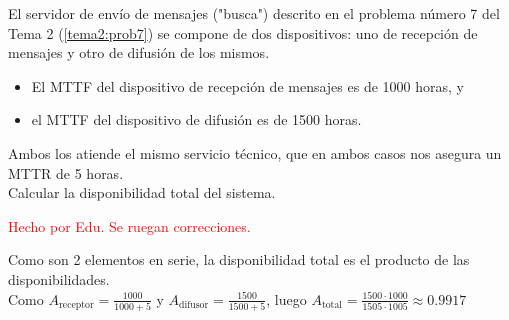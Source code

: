 \begin{problem}[3]
El servidor de envío de mensajes ("busca") descrito en el problema número 7 del Tema 2 (\ref{tema2:prob7}) se compone de dos dispositivos: uno de recepción de mensajes y otro de difusión de los mismos.
\begin{itemize}
\item El MTTF del dispositivo de recepción de mensajes es de 1000 horas, y
\item el MTTF del dispositivo de difusión es de 1500 horas.
\end{itemize}
Ambos los atiende el mismo servicio técnico, que en ambos casos nos asegura un MTTR de 5 horas.\\

Calcular la disponibilidad total del sistema.

\solution
\textcolor{red}{Hecho por Edu. Se ruegan correcciones.}

Como son 2 elementos en serie, la disponibilidad total es el producto de las disponibilidades.\\

Como $ A_{\text{receptor}} = \frac{1000}{1000+5}$ y $A_{\text{difusor}} = \frac{1500}{1500+5}$, luego $A_{\text{total}} = \frac{1500\cdot1000}{1505\cdot1005} \approx 0.9917$

\end{problem}

